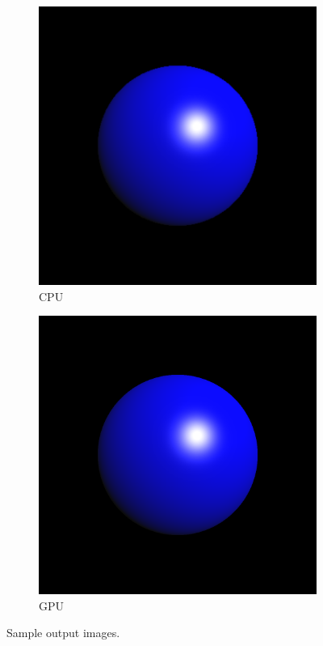 \documentclass{article}
\begin{document}
\begin{figure}
    \begin{subfigure}{0.5\linewidth}
        \includegraphics[width=\linewidth]{../raytracing_py_trim.png}
        \caption{CPU}
    \end{subfigure}
    \begin{subfigure}{0.5\linewidth}
        \includegraphics[width=\linewidth]{output.png}
        \caption{GPU}
    \end{subfigure}
    \caption{Sample output images.}
    \label{fig:output}
\end{figure}
\end{document}
